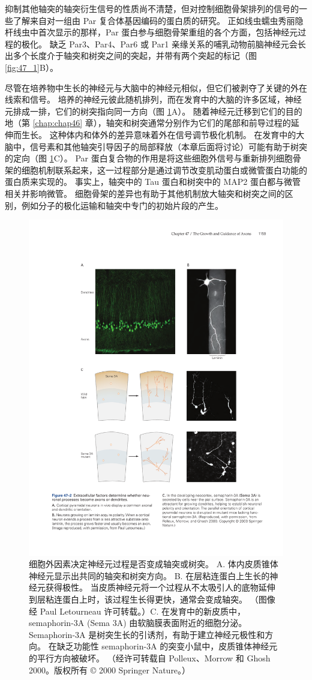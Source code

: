 抑制其他轴突的轴突衍生信号的性质尚不清楚，但对控制细胞骨架排列的信号的一些了解来自对一组由 Par 复合体基因编码的蛋白质的研究。
正如线虫蠕虫秀丽隐杆线虫中首次显示的那样，Par 蛋白参与细胞骨架重组的各个方面，包括神经元过程的极化。
缺乏 Par3、Par4、Par6 或 Par1 亲缘关系的哺乳动物前脑神经元会长出多个长度介于轴突和树突之间的突起，并带有两个突起的标记（图 \ref{fig:47_1}B）。


尽管在培养物中生长的神经元与大脑中的神经元相似，但它们被剥夺了关键的外在线索和信号。
培养的神经元彼此随机排列，而在发育中的大脑的许多区域，神经元排成一排，它们的树突指向同一方向（图 \ref{fig:47_2}A）。
随着神经元迁移到它们的目的地（第 \ref{chap:chap46} 章），轴突和树突通常分别作为它们的尾部和前导过程的延伸而生长。
这种体内和体外的差异意味着外在信号调节极化机制。 在发育中的大脑中，信号素和其他轴突引导因子的局部释放（本章后面将讨论）可能有助于树突的定向（图 \ref{fig:47_2}C）。
Par 蛋白复合物的作用是将这些细胞外信号与重新排列细胞骨架的细胞机制联系起来，这一过程部分是通过调节改变肌动蛋白或微管蛋白功能的蛋白质来实现的。
事实上，轴突中的 Tau 蛋白和树突中的 MAP2 蛋白都与微管相关并影响微管。
细胞骨架的差异也有助于其他机制放大轴突和树突之间的区别，例如分子的极化运输和轴突中专门的初始片段的产生。


\begin{figure}[htbp]
	\centering
	\includegraphics[width=0.65\linewidth]{chap47/fig_47_2}
	\caption{细胞外因素决定神经元过程是否变成轴突或树突。 A. 体内皮质锥体神经元显示出共同的轴突和树突方向。 B. 在层粘连蛋白上生长的神经元获得极性。 当皮质神经元将一个过程从不太吸引人的底物延伸到层粘连蛋白上时，该过程生长得更快，通常会变成轴突。 （图像经 Paul Letourneau 许可转载。）C. 在发育中的新皮质中，semaphorin-3A (Sema 3A) 由软脑膜表面附近的细胞分泌。 Semaphorin-3A 是树突生长的引诱剂，有助于建立神经元极性和方向。 在缺乏功能性 semaphorin-3A 的突变小鼠中，皮质锥体神经元的平行方向被破坏。 （经许可转载自 Polleux、Morrow 和 Ghosh 2000。版权所有 © 2000 Springer Nature。）}
	\label{fig:47_2}
\end{figure}


